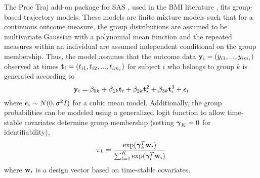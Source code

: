 The Proc Traj add-on package for SAS \cite{jones2001}, used in the BMI literature \cite{pryor2011,carter2012}, fits group-based trajectory models. These models are finite mixture models such that for a continuous outcome measure, the group distributions are assumed to be multivariate Gaussian with a polynomial mean function and the repeated measures within an individual are assumed independent conditional on the group membership. Thus, the model assumes that the outcome data $\mathbf y_{i} = (y_{i1},...,y_{im_{i}})$ observed at times $\mathbf t_{i} = (t_{i1},t_{i2},...,t_{im_{i}})$ for subject $i$ who belongs to group $k$ is generated according to
$$\mathbf y_{i} = \beta_{0k}+\beta_{1k} \mathbf t_{i} + \beta_{2k}\mathbf t_{i}^{2}+ \beta_{3k} \mathbf t_{i}^{3} + \boldsymbol\epsilon_{i}$$
where $\boldsymbol\epsilon_{i}\sim N(0,\sigma^{2}I)$ for a cubic mean model. Additionally, the group probabilities can be modeled using a generalized logit function to allow time-stable covariates determine group membership (setting $\boldsymbol\gamma_{K}=0$ for identifiability),
$$\pi_{k}=\frac{\exp(\boldsymbol\gamma_{k}^{T}\mathbf w_{i})}{\sum^{K}_{l=1}\exp(\boldsymbol\gamma_{l}^{T}\mathbf w_{i})}$$
where $\mathbf w_{i}$ is a design vector based on time-stable covariates. 

